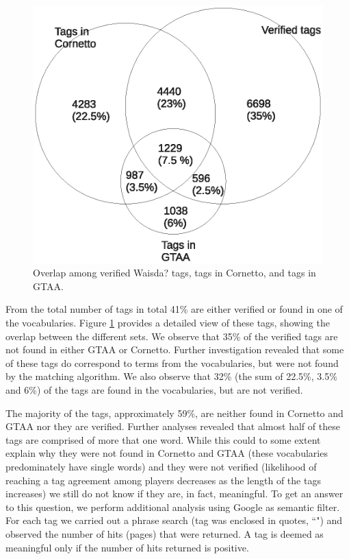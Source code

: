 \begin{figure}[t!]
\centering
\includegraphics[width=\columnwidth, trim=0 50 0 0, clip=true]{kcap:venn-diagram.eps} 
\caption{Overlap among verified Waisda? tags,  tags in Cornetto, and tags in GTAA. %
}
\label{venndiagram}
\end{figure}

From the total number of tags in total 41\% are either verified or found in
one of the vocabularies. Figure \ref{venndiagram} provides a detailed view of
these tags, showing the overlap between the different sets. We observe that
35\% of the verified tags are not found in either GTAA or Cornetto. Further
investigation revealed that some of these tags do correspond to terms from the
vocabularies, but were not found by the matching algorithm. We also observe
that 32\% (the sum of 22.5\%, 3.5\% and 6\%) of the tags are found in the
vocabularies, but are not verified.

The majority of the tags, approximately 59\%, are neither found in Cornetto
and GTAA nor they are verified. Further analyses revealed that almost half of
these tags are comprised of more that one word. While this could to some
extent explain why they were not found in Cornetto and GTAA (these
vocabularies predominately have single words) and they were not verified
(likelihood of reaching a tag agreement among players decreases as the length
of the tags increases) we still do not know if they are, in fact, meaningful.
To get an answer to this question, we perform additional analysis using Google
as semantic filter. For each tag we carried out a  phrase search (tag was enclosed in quotes, ``")  and observed the number of hits (pages) that were returned. A tag is deemed as meaningful
only if the number of hits returned is positive.

